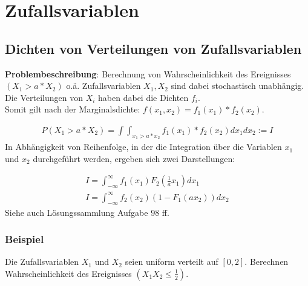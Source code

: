\documentclass{article}
\begin{document}
\section{Zufallsvariablen}
\subsection{Dichten von Verteilungen von Zufallsvariablen}
\textbf{Problembeschreibung}: Berechnung von Wahrscheinlichkeit des
Ereignisses $(X_1 > a * X_2)$ o.\"a.
Zufallsvariablen $X_1, X_2$  sind dabei stochastisch
unabh\"angig. Die Verteilungen von $X_i$ haben dabei die Dichten
$f_i$.\\
Somit gilt nach der Marginalsdichte: $f(x_1,x_2) = f_1(x_1)*f_2(x_2)$.

\begin{align}
	P(X_1 > a * X_2) = \int \int_{x_1>a*x_2} f_1(x_1)*f_2(x_2) dx_1dx_2 := I
\end{align}
In Abh\"angigkeit von Reihenfolge, in der die Integration \"uber die Variablen
$x_1$ und $x_2$ durchgef\"uhrt werden, ergeben sich zwei Darstellungen:

\begin{align}
	I = \int_{-\infty}^{\infty} f_1(x_1)F_2(\frac{1}{a}x_1)dx_1\\
	I = \int_{-\infty}^{\infty} f_2(x_2)(1 - F_1(ax_2))dx_2
\end{align}
Siehe auch L\"osungssammlung Aufgabe $98$ ff.

\subsubsection{Beispiel}
Die Zufallsvariablen $X_1$ und $X_2$ seien uniform verteilt auf
$[0, 2]$. Berechnen Wahrscheinlichkeit des Ereignisses $(X_1X_2 \leq \frac{1}{2})$.
\end{document}
